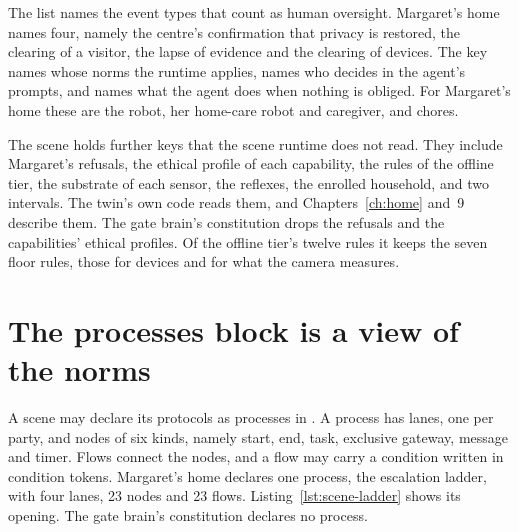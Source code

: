 The  list names the event types that count as human oversight. Margaret's home names
four, namely the centre's confirmation that privacy is restored, the clearing of a visitor, the lapse
of evidence and the clearing of devices. The  key names whose norms the runtime applies,
 names who decides in the agent's prompts, and  names what the agent
does when nothing is obliged. For Margaret's home these are the robot, her home-care robot and
caregiver, and chores.

The scene holds further keys that the scene runtime does not read. They include Margaret's refusals,
the ethical profile of each capability, the rules of the offline tier, the substrate of each sensor,
the reflexes, the enrolled household, and two intervals. The twin's own code reads them, and
Chapters~\ref{ch:home} and~9 describe them. The gate brain's constitution drops the refusals
and the capabilities' ethical profiles. Of the offline tier's twelve rules it keeps the seven
floor rules, those for devices and for what the camera measures.

\section{The processes block is a view of the norms}\label{sec:erisml-processes}

A scene may declare its protocols as processes in . A process has lanes, one
per party, and nodes of six kinds, namely start, end, task, exclusive gateway, message and timer.
Flows connect the nodes, and a flow may carry a  condition written in condition tokens.
Margaret's home declares one process, the escalation ladder, with four lanes, 23 nodes and 23 flows.
Listing~\ref{lst:scene-ladder} shows its opening. The gate brain's constitution declares no
process.

